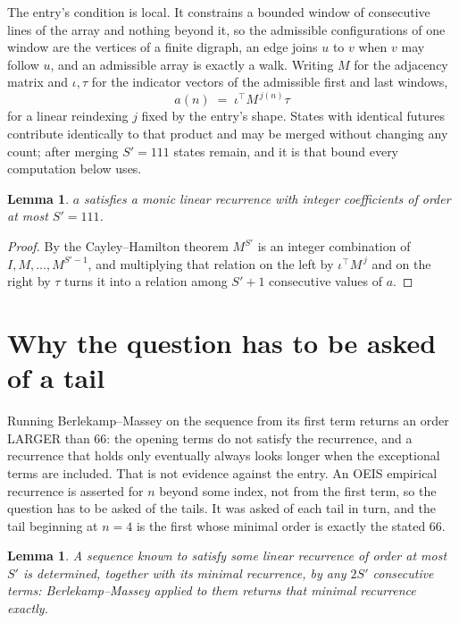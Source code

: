 \documentclass[11pt,a4paper]{article}
\theoremstyle{plain}
\newtheorem{lemma}[theorem]{Lemma}
\theoremstyle{definition}
\begin{document}
The entry's condition is local. It constrains a bounded window of consecutive lines of the
array and nothing beyond it, so the admissible configurations of one window are the vertices of
a finite digraph, an edge joins $u$ to $v$ when $v$ may follow $u$, and an admissible array is
exactly a walk. Writing $M$ for the adjacency matrix and $\iota,\tau$ for the indicator vectors
of the admissible first and last windows,
\[
a(n)\;=\;\iota^{\!\top}M^{\,j(n)}\tau
\]
for a linear reindexing $j$ fixed by the entry's shape. States with identical futures
contribute identically to that product and may be merged without changing any count; after
merging $S'=111$ states remain, and it is that bound every computation below uses.

\begin{lemma}\label{lem:cf}
$a$ satisfies a monic linear recurrence with integer coefficients of order at most $S'=111$.
\end{lemma}

\begin{proof}
By the Cayley--Hamilton theorem $M^{S'}$ is an integer combination of $I,M,\dots,M^{S'-1}$,
and multiplying that relation on the left by $\iota^{\!\top}M^{\,j}$ and on the right by
$\tau$ turns it into a relation among $S'+1$ consecutive values of $a$.
\end{proof}

\section{Why the question has to be asked of a tail}

Running Berlekamp--Massey on the sequence from its first term returns an order LARGER than $66$: the opening terms do not satisfy the recurrence, and a recurrence that holds only eventually always looks longer when the exceptional terms are included. That is not evidence against the entry. An OEIS empirical recurrence is asserted for $n$ beyond some index, not from the first term, so the question has to be asked of the tails. It was asked of each tail in turn, and the tail beginning at $n=4$ is the first whose minimal order is exactly the stated $66$.

\begin{lemma}\label{lem:bm}
A sequence known to satisfy some linear recurrence of order at most $S'$ is determined,
together with its minimal recurrence, by any $2S'$ consecutive terms: Berlekamp--Massey applied
to them returns that minimal recurrence exactly.
\end{lemma}
\end{document}
